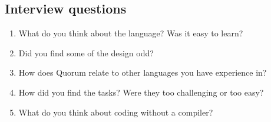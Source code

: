 \subsection{Interview questions}
\begin{enumerate}
\item What do you think about the language? Was it easy to learn?
\item Did you find some of the design odd?
\item How does Quorum relate to other languages you have experience in?
\item How did you find the tasks? Were they too challenging or too easy?
\item What do you think about coding without a compiler?
\end{enumerate}	